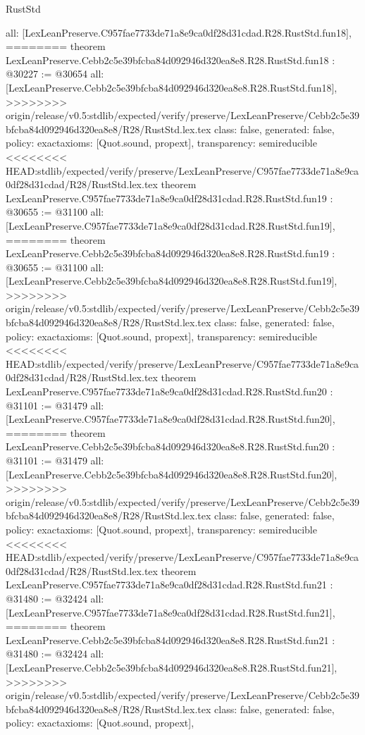 \begin{lexlean}{RustStd}
\begin{coremodule}
{\begin{coremodule}
{{{{{{{{{{{{{{{{{{{{{  all: [LexLeanPreserve.C957fae7733de71a8e9ca0df28d31cdad.R28.RustStd.fun18],
========
theorem LexLeanPreserve.Cebb2c5e39bfcba84d092946d320ea8e8.R28.RustStd.fun18 : @30227 := @30654 {
  all: [LexLeanPreserve.Cebb2c5e39bfcba84d092946d320ea8e8.R28.RustStd.fun18],
>>>>>>>> origin/release/v0.5:stdlib/expected/verify/preserve/LexLeanPreserve/Cebb2c5e39bfcba84d092946d320ea8e8/R28/RustStd.lex.tex
  class: false,
  generated: false,
  policy: exact{axioms: [Quot.sound, propext]},
  transparency: semireducible
}
<<<<<<<< HEAD:stdlib/expected/verify/preserve/LexLeanPreserve/C957fae7733de71a8e9ca0df28d31cdad/R28/RustStd.lex.tex
theorem LexLeanPreserve.C957fae7733de71a8e9ca0df28d31cdad.R28.RustStd.fun19 : @30655 := @31100 {
  all: [LexLeanPreserve.C957fae7733de71a8e9ca0df28d31cdad.R28.RustStd.fun19],
========
theorem LexLeanPreserve.Cebb2c5e39bfcba84d092946d320ea8e8.R28.RustStd.fun19 : @30655 := @31100 {
  all: [LexLeanPreserve.Cebb2c5e39bfcba84d092946d320ea8e8.R28.RustStd.fun19],
>>>>>>>> origin/release/v0.5:stdlib/expected/verify/preserve/LexLeanPreserve/Cebb2c5e39bfcba84d092946d320ea8e8/R28/RustStd.lex.tex
  class: false,
  generated: false,
  policy: exact{axioms: [Quot.sound, propext]},
  transparency: semireducible
}
<<<<<<<< HEAD:stdlib/expected/verify/preserve/LexLeanPreserve/C957fae7733de71a8e9ca0df28d31cdad/R28/RustStd.lex.tex
theorem LexLeanPreserve.C957fae7733de71a8e9ca0df28d31cdad.R28.RustStd.fun20 : @31101 := @31479 {
  all: [LexLeanPreserve.C957fae7733de71a8e9ca0df28d31cdad.R28.RustStd.fun20],
========
theorem LexLeanPreserve.Cebb2c5e39bfcba84d092946d320ea8e8.R28.RustStd.fun20 : @31101 := @31479 {
  all: [LexLeanPreserve.Cebb2c5e39bfcba84d092946d320ea8e8.R28.RustStd.fun20],
>>>>>>>> origin/release/v0.5:stdlib/expected/verify/preserve/LexLeanPreserve/Cebb2c5e39bfcba84d092946d320ea8e8/R28/RustStd.lex.tex
  class: false,
  generated: false,
  policy: exact{axioms: [Quot.sound, propext]},
  transparency: semireducible
}
<<<<<<<< HEAD:stdlib/expected/verify/preserve/LexLeanPreserve/C957fae7733de71a8e9ca0df28d31cdad/R28/RustStd.lex.tex
theorem LexLeanPreserve.C957fae7733de71a8e9ca0df28d31cdad.R28.RustStd.fun21 : @31480 := @32424 {
  all: [LexLeanPreserve.C957fae7733de71a8e9ca0df28d31cdad.R28.RustStd.fun21],
========
theorem LexLeanPreserve.Cebb2c5e39bfcba84d092946d320ea8e8.R28.RustStd.fun21 : @31480 := @32424 {
  all: [LexLeanPreserve.Cebb2c5e39bfcba84d092946d320ea8e8.R28.RustStd.fun21],
>>>>>>>> origin/release/v0.5:stdlib/expected/verify/preserve/LexLeanPreserve/Cebb2c5e39bfcba84d092946d320ea8e8/R28/RustStd.lex.tex
  class: false,
  generated: false,
  policy: exact{axioms: [Quot.sound, propext]},
}}}}}}}}}}}}}}}}}}}}}}}}}
\end{coremodule}}
\end{coremodule}
\end{lexlean}
